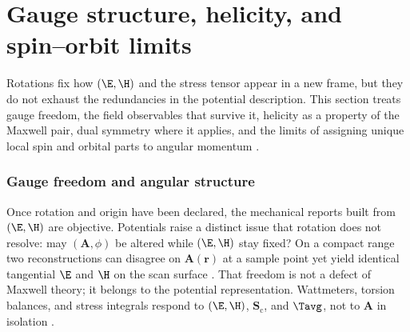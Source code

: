 \label{sec:ch01.3.4}

\FloatBarrier
\section{Gauge structure, helicity, and spin--orbit limits}
\label{sec:ch01.4}

Rotations fix how $(\E,\H)$ and the stress tensor appear in a new frame, but they do not exhaust the redundancies in the potential description. This section treats gauge freedom, the field observables that survive it, helicity as a property of the Maxwell pair, dual symmetry where it applies, and the limits of assigning unique local spin and orbital parts to angular momentum \cite{belinfante1940,jackson1999,stratton1941}.

\label{sec:ch01.4.2}
\label{prin:ch1.angular-em-structure}

\subsubsection*{Gauge freedom and angular structure}

Once rotation and origin have been declared, the mechanical reports built from $(\E,\H)$ are objective. Potentials raise a distinct issue that rotation does not resolve: may $(\mathbf{A},\phi)$ be altered while $(\E,\H)$ stay fixed? On a compact range two reconstructions can disagree on $\mathbf{A}(\mathbf{r})$ at a sample point yet yield identical tangential $\E$ and $\H$ on the scan surface \cite{stratton1941,hansen1988}. That freedom is not a defect of Maxwell theory; it belongs to the potential representation. Wattmeters, torsion balances, and stress integrals respond to $(\E,\H)$, $\mathbf{S}_\mathrm{c}$, and $\Tavg$, not to $\mathbf{A}$ in isolation \cite{maxwell1873,beth1936}.

